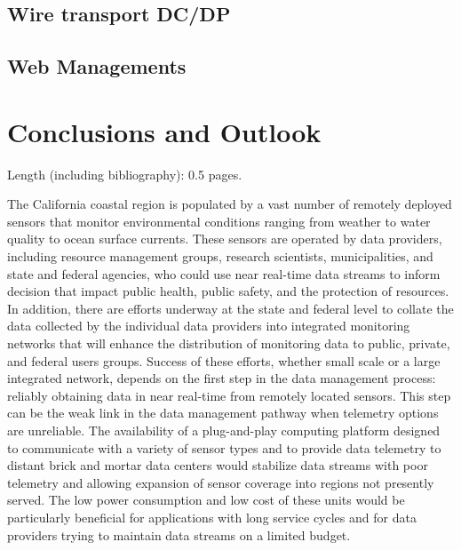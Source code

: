 \documentclass[conference]{IEEEtran}
\begin{document}
\subsection{Wire transport DC/DP}

\subsection{Web Managements}


\section{Conclusions and Outlook}

Length (including bibliography): 0.5 pages.

The California coastal region is populated by a vast number of
remotely deployed sensors that monitor environmental conditions
ranging from weather to water quality to ocean surface currents.
These sensors are operated by data providers, including resource
management groups, research scientists, municipalities, and state and
federal agencies, who could use near real-time data streams to inform
decision that impact public health, public safety, and the protection
of resources.  In addition, there are efforts underway at the state
and federal level to collate the data collected by the individual data
providers into integrated monitoring networks that will enhance the
distribution of monitoring data to public, private, and federal users
groups.  Success of these efforts, whether small scale or a large
integrated network, depends on the first step in the data management
process: reliably obtaining data in near real-time from remotely
located sensors.  This step can be the weak link in the data
management pathway when telemetry options are unreliable.  The
availability of a plug-and-play computing platform designed to
communicate with a variety of sensor types and to provide data
telemetry to distant brick and mortar data centers would stabilize
data streams with poor telemetry and allowing expansion of sensor
coverage into regions not presently served.  The low power consumption
and low cost of these units would be particularly beneficial for
applications with long service cycles and for data providers trying to
maintain data streams on a limited budget.



\end{document}
